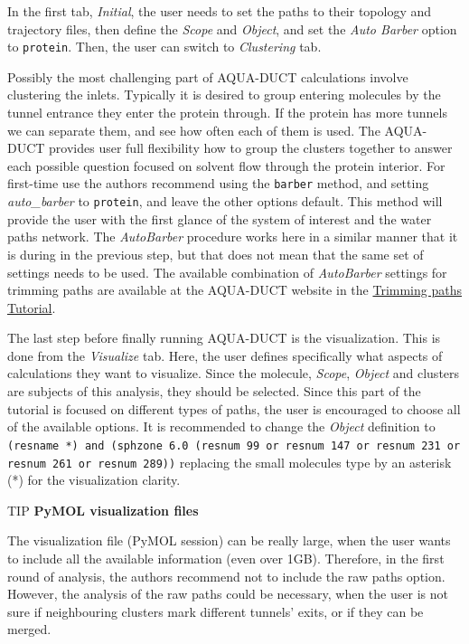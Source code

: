 \documentclass[9pt,tutorial]{livecoms}
\begin{document}
In the first tab, \textit{Initial}, the user needs to set the paths to their topology and trajectory files, then define the \emph{Scope} and \emph{Object}, and set the \textit{Auto Barber} option to \texttt{protein}. Then, the user can switch to \textit{Clustering} tab.

Possibly the most challenging part of AQUA-DUCT calculations involve clustering the inlets. Typically it is desired to group entering molecules by the tunnel entrance they enter the protein through. If the protein has more tunnels we can separate them, and see how often each of them is used. The AQUA-DUCT provides user full flexibility how to group the clusters together to answer each possible question focused on solvent flow through the protein interior.  
For first-time use the authors recommend using the \texttt{barber} method, and setting \emph{auto\_barber} to \texttt{protein}, and leave the other options default. This method will provide the user with the first glance of the system of interest and the water paths network. The \emph{AutoBarber} procedure works here in a similar manner that it is during in the previous step, but that does not mean that the same set of settings needs to be used. The available combination of \emph{AutoBarber} settings for trimming paths are available at the AQUA-DUCT website in the \href{http://www.aquaduct.pl/trimming-paths/}{Trimming paths Tutorial}.

The last step before finally running AQUA-DUCT is the visualization. This is done from the \textit{Visualize} tab. Here, the user defines specifically what aspects of calculations they want to visualize. Since the  molecule, \emph{Scope}, \emph{Object} and clusters are subjects of this analysis, they should be selected. Since this part of the tutorial is focused on different types of paths, the user is encouraged to choose all of the available options. It is recommended to change the \emph{Object} definition to \texttt{(resname *) and (sphzone 6.0 (resnum 99 or resnum 147 or resnum 231 or resnum 261 or resnum 289))} replacing the small molecules type by an asterisk (*) for the visualization clarity.

\begin{Checklists}
\begin{checklist}{TIP}
\textbf{PyMOL visualization files}

The visualization file (PyMOL session) can be really large, when the user wants to include all the available information (even over 1GB). Therefore, in the first round of analysis, the authors recommend not to include the raw paths option. However, the analysis of the raw paths could be necessary, when the user is not sure if neighbouring clusters mark different tunnels’ exits, or if they can be merged.
\end{checklist}
\end{Checklists}
\end{document}
